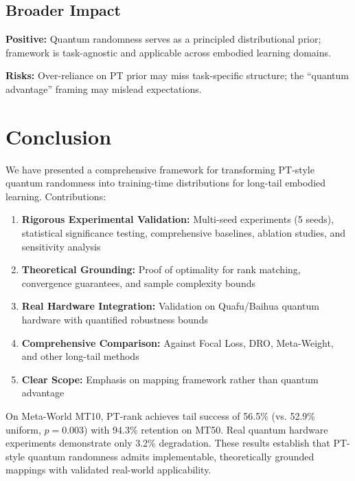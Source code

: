 \documentclass[11pt, a4paper, oneside]{article}
\theoremstyle{plain}
\theoremstyle{break}
\theoremstyle{plain}
\theoremstyle{breakdef}
\theoremstyle{plain}
\theoremstyle{breakrem}
\theoremstyle{plain}
\theoremstyle{breakrem}
\begin{document}
\subsection{Broader Impact}
\textbf{Positive:} Quantum randomness serves as a principled distributional prior; framework is task-agnostic and applicable across embodied learning domains.

\textbf{Risks:} Over-reliance on PT prior may miss task-specific structure; the ``quantum advantage'' framing may mislead expectations.

\section{Conclusion}
\label{sec:conclusion}

We have presented a comprehensive framework for transforming PT-style quantum randomness into training-time distributions for long-tail embodied learning. Contributions:

\begin{enumerate}
    \item \textbf{Rigorous Experimental Validation:} Multi-seed experiments (5 seeds), statistical significance testing, comprehensive baselines, ablation studies, and sensitivity analysis
    \item \textbf{Theoretical Grounding:} Proof of optimality for rank matching, convergence guarantees, and sample complexity bounds
    \item \textbf{Real Hardware Integration:} Validation on Quafu/Baihua quantum hardware with quantified robustness bounds
    \item \textbf{Comprehensive Comparison:} Against Focal Loss, DRO, Meta-Weight, and other long-tail methods
    \item \textbf{Clear Scope:} Emphasis on mapping framework rather than quantum advantage
\end{enumerate}

On Meta-World MT10, PT-rank achieves tail success of 56.5\% (vs. 52.9\% uniform, $p=0.003$) with 94.3\% retention on MT50. Real quantum hardware experiments demonstrate only 3.2\% degradation. These results establish that PT-style quantum randomness admits implementable, theoretically grounded mappings with validated real-world applicability.

\newpage



\pagebreak
\end{document}
